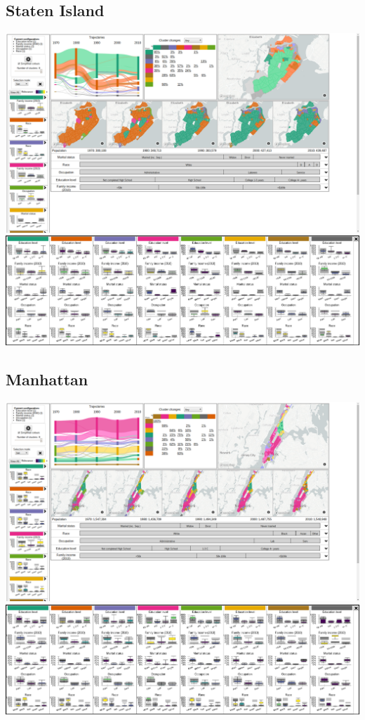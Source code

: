 \documentclass[a4paper]{article}
\begin{document}
\subsection{Staten Island}
\begin{center}
	\includegraphics[width=\linewidth]{11a.png}
	\includegraphics[width=\linewidth]{11b.png}
\end{center} \clearpage



\subsection{Manhattan}
\begin{center}
	\includegraphics[width=\linewidth]{12a.png}
	\includegraphics[width=\linewidth]{12b.png}
\end{center} \clearpage
\end{document}
